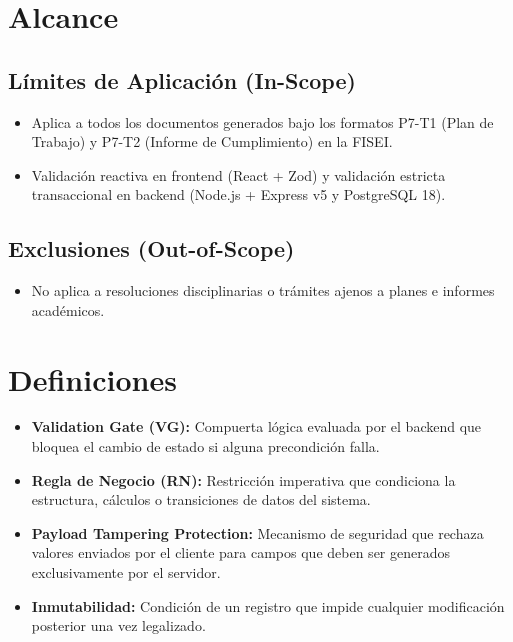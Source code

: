 \documentclass[12pt,a4paper]{article}
\begin{document}
\section{Alcance}

\subsection{Límites de Aplicación (In-Scope)}
\begin{itemize}[leftmargin=1.5em, itemsep=2pt]
    \item Aplica a todos los documentos generados bajo los formatos P7-T1 (Plan de Trabajo) y P7-T2 (Informe de Cumplimiento) en la FISEI.
    \item Validación reactiva en frontend (React + Zod) y validación estricta transaccional en backend (Node.js + Express v5 y PostgreSQL 18).
\end{itemize}

\subsection{Exclusiones (Out-of-Scope)}
\begin{itemize}[leftmargin=1.5em, itemsep=2pt]
    \item No aplica a resoluciones disciplinarias o trámites ajenos a planes e informes académicos.
\end{itemize}

\section{Definiciones}
\begin{itemize}[leftmargin=1.5em, itemsep=2pt]
    \item \textbf{Validation Gate (VG):} Compuerta lógica evaluada por el backend que bloquea el cambio de estado si alguna precondición falla.
    \item \textbf{Regla de Negocio (RN):} Restricción imperativa que condiciona la estructura, cálculos o transiciones de datos del sistema.
    \item \textbf{Payload Tampering Protection:} Mecanismo de seguridad que rechaza valores enviados por el cliente para campos que deben ser generados exclusivamente por el servidor.
    \item \textbf{Inmutabilidad:} Condición de un registro que impide cualquier modificación posterior una vez legalizado.
\end{itemize}
\end{document}
